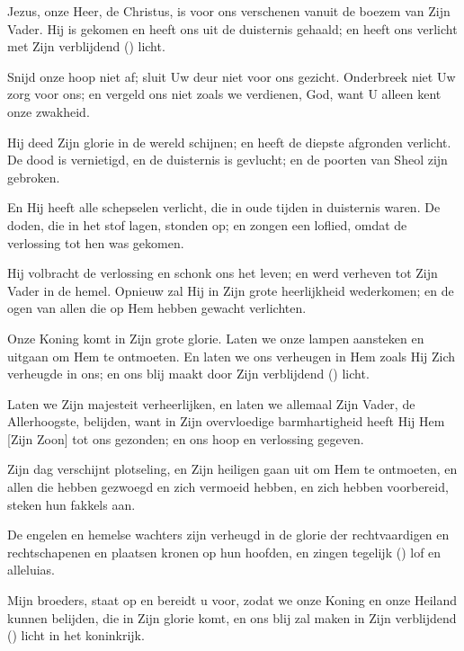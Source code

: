 \documentclass[12pt,twoside,a5paper]{article}
\begin{document}


\begin{halfparskip}
\end{halfparskip}


\begin{halfparskip}
   Jezus, onze Heer, de Christus, is voor ons verschenen vanuit de boezem van Zijn Vader. Hij is gekomen en heeft ons uit de duisternis gehaald; en heeft ons verlicht met Zijn verblijdend () licht.

   Snijd onze hoop niet af; sluit Uw deur niet voor ons gezicht. Onderbreek niet Uw zorg voor ons; en vergeld ons niet zoals we verdienen, God, want U alleen kent onze zwakheid.

   Hij deed Zijn glorie in de wereld schijnen; en heeft de diepste afgronden verlicht. De dood is vernietigd, en de duisternis is gevlucht; en de poorten van Sheol zijn gebroken.

   En Hij heeft alle schepselen verlicht, die in oude tijden in duisternis waren. De doden, die in het stof lagen, stonden op; en zongen een loflied, omdat de verlossing tot hen was gekomen.

   Hij volbracht de verlossing en schonk ons het leven; en werd verheven tot Zijn Vader in de hemel. Opnieuw zal Hij in Zijn grote heerlijkheid wederkomen; en de ogen van allen die op Hem hebben gewacht verlichten.

   Onze Koning komt in Zijn grote glorie. Laten we onze lampen aansteken en uitgaan om Hem te ontmoeten. En laten we ons verheugen in Hem zoals Hij Zich verheugde in ons; en ons blij maakt door Zijn verblijdend () licht.

   Laten we Zijn majesteit verheerlijken, en laten we allemaal Zijn Vader, de Allerhoogste, belijden, want in Zijn overvloedige barmhartigheid heeft Hij Hem [Zijn Zoon] tot ons gezonden; en ons hoop en verlossing gegeven.

   Zijn dag verschijnt plotseling, en Zijn heiligen gaan uit om Hem te ontmoeten, en allen die hebben gezwoegd en zich vermoeid hebben, en zich hebben voorbereid, steken hun fakkels aan.

   De engelen en hemelse wachters zijn verheugd in de glorie der rechtvaardigen en rechtschapenen en plaatsen kronen op hun hoofden, en zingen tegelijk () lof en alleluias.

   Mijn broeders, staat op en bereidt u voor, zodat we onze Koning en onze Heiland kunnen belijden, die in Zijn glorie komt, en ons blij zal maken in Zijn verblijdend () licht in het koninkrijk.
\end{halfparskip}
\end{document}
